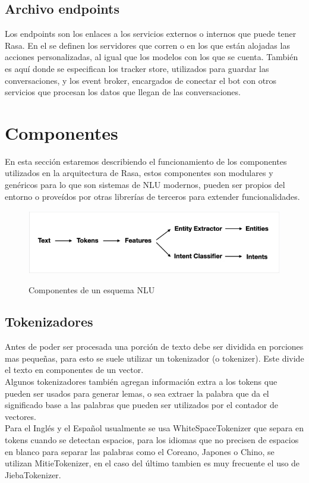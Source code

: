\subsection{Archivo endpoints}
Los endpoints son los enlaces a los servicios externos o internos que puede tener Rasa. En el se definen los servidores que corren o en los que están alojadas las acciones personalizadas, al igual que los modelos con los que se cuenta. También es aquí donde se especifican los tracker store, utilizados para guardar las conversaciones, y los event broker, encargados de conectar el bot con otros servicios que procesan los datos que llegan de las conversaciones.

\section{Componentes}\label{ch:Componentes}
En esta sección estaremos describiendo el funcionamiento de los componentes utilizados en la arquitectura de Rasa, 
estos componentes son modulares y genéricos para lo que son sistemas de NLU modernos, pueden ser propios del
entorno o proveídos por otras librerías de terceros para extender funcionalidades.

\begin{figure}[h]
    \centering
    \includegraphics[width=\textwidth]{imagenes/cap3/rasa_components.png}   
    \caption{Componentes de un esquema NLU}
    \label{fig:Componentes-MLU}
    \cite{Rasa}
\end{figure}

\subsection{Tokenizadores}
Antes de poder ser procesada una porción de texto debe ser dividida en porciones mas pequeñas, para esto se suele utilizar 
un tokenizador (o tokenizer).   Este divide el texto en componentes de un vector.\\ Algunos tokenizadores también
agregan información extra a los tokens que pueden ser usados para generar lemas, o sea extraer la palabra que da el significado base a las palabras que pueden ser utilizados por el contador de vectores.\\
Para el Inglés y el Español usualmente se usa WhiteSpaceTokenizer que separa en tokens cuando se detectan espacios, para los idiomas que no precisen de espacios en blanco para separar las palabras como el Coreano, Japones o Chino, se utilizan MitieTokenizer, en el caso del último tambien es muy frecuente el uso de JiebaTokenizer.\cite{warmerdam_2022}

